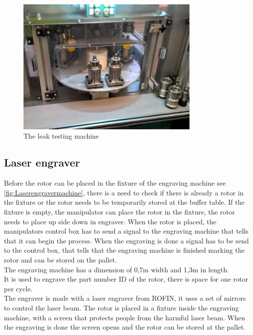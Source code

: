  
 \begin{figure}[H]
    \centering
    \includegraphics[width=9cm]{InitialProblemstatement/Case/Leaktest.PNG}
    \caption{The leak testing machine\cite{Case}}
    \label{fig:Leak testing machine}
\end{figure}
 
 \subsection{Laser engraver}
 Before the rotor can be placed in the fixture of the engraving machine see \ref{fig:Laserengravermachine}, there is a need to check if there is already a rotor in the fixture or the rotor needs to be temporarily stored at the buffer table. If the fixture is empty, the manipulator can place the rotor in the fixture, the rotor needs to place up side down in engraver. When the rotor is placed, the manipulators control box has to send a signal to the engraving machine that tells that it can begin the process. When the engraving is done a signal has to be send to the control box, that tells that the engraving machine is finished marking the rotor and can be stored on the pallet.\\
 The engraving machine has a dimension of 0,7m width and 1,3m in length. \\
 It is used to engrave the part number ID of the rotor, there is space for one rotor per cycle.\\
 The engraver is made with a laser engraver from ROFIN, it uses a set of mirrors to control the laser beam\cite{laser}. The rotor is placed in a fixture inside the engraving machine, with a screen that protects people from the harmful laser beam. When the engraving is done the screen opens and the rotor can be stored at the pallet. \\   
  
